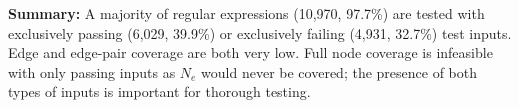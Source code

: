\textbf{Summary:}
A majority of regular expressions (10,970, 97.7\%) are tested with exclusively passing (6,029, 39.9\%) or exclusively failing (4,931, 32.7\%) test inputs. 
Edge and edge-pair coverage are both very low. 
Full node coverage is infeasible with only passing inputs as $N_e$ would never be covered; the presence of both types of inputs is important for thorough testing. 


